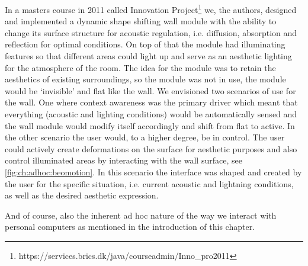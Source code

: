 In a masters course in 2011 called Innovation Project\footnote{https://services.brics.dk/java/courseadmin/Inno\_pro2011} \cite{beomotionreportstefan, beomotionreporttore}  we, the authors, designed and implemented a dynamic shape shifting wall module with the ability to change its surface structure for acoustic regulation, i.e. diffusion, absorption and reflection for optimal conditions.
On top of that the module had illuminating features so that different areas could light up and serve as an aesthetic lighting for the atmosphere of the room.
The idea for the module was to retain the aesthetics of existing surroundings, so the module was not in use, the module would be `invisible' and flat like the wall.  
We envisioned two scenarios of use for the wall.
One where context awareness was the primary driver which meant that everything (acoustic and lighting conditions) would be automatically sensed and the wall module would modify itself accordingly and shift from flat to active.
In the other scenario the user would, to a higher degree, be in control.
The user could actively create deformations on the surface for aesthetic purposes and also control illuminated areas by interacting with the wall surface, see \ref{fig:ch:adhoc:beomotion}.
In this scenario the interface was shaped and created by the user for the specific situation, i.e. current acoustic and lightning conditions, as well as the desired aesthetic expression. 

 And of course, also the inherent ad hoc nature of the way we interact with personal computers as mentioned in the introduction of this chapter.
\blank
{} 

